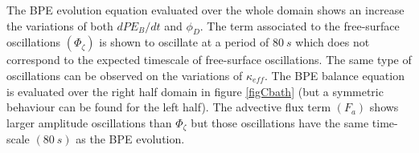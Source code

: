 The BPE evolution equation evaluated over the whole domain shows an increase the variations of both $dPE_B/dt$ and $\phi_D$. The term associated to the free-surface oscillations $(\Phi_{\zeta})$ is shown to oscillate at a period of $80\ s$ which does not correspond to the expected timescale of free-surface oscillations. The same type of oscillations can be observed on the variations of $\kappa_{eff}$. 
The BPE balance equation is evaluated over the right half domain in figure \ref{figCbath} (but a symmetric behaviour can be found for the left half). The advective flux term $(F_a)$ shows larger amplitude oscillations than $\Phi_{\zeta}$ but those oscillations have the same time-scale $(80\ s)$ as the BPE evolution.

